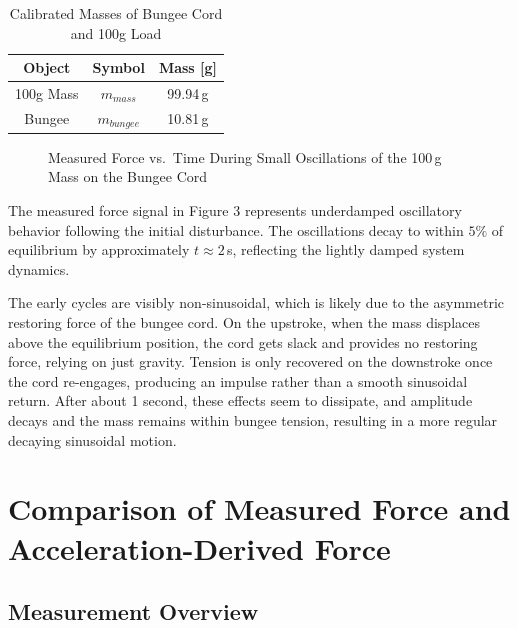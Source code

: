 \documentclass{article}
\begin{document}
\begin{table}[H]
    \centering
    \caption{Calibrated Masses of Bungee Cord and 100g Load}
    \label{tab:placehold}
    \begin{tabular}{ccc}
        \toprule
        \textbf{Object} & \textbf{Symbol} & \textbf{Mass [g]} \\
        \midrule
        100g Mass   & $m_{mass}$   &    99.94\,g \\
        Bungee  &   $m_{bungee}$    & 10.81\,g \\
        \bottomrule
    \end{tabular}
\end{table}

\begin{figure}[H]
    \centering
    \caption{Measured Force vs.\ Time During Small Oscillations of the 100\,g Mass on the Bungee Cord}
    \label{fig:force_meas}
\end{figure}

\noindent The measured force signal in Figure 3 represents underdamped oscillatory behavior following the initial disturbance. The oscillations decay to within $5\%$ of equilibrium by approximately $t \approx 2$\,s, reflecting the lightly damped system dynamics.

The early cycles are visibly non-sinusoidal, which is likely due to the asymmetric restoring force of the bungee cord. On the upstroke, when the mass displaces above the equilibrium position, the cord gets slack and provides no restoring force, relying on just gravity. Tension is only recovered on the downstroke once the cord re-engages, producing an impulse rather than a smooth sinusoidal return. After about 1 second, these effects seem to dissipate, and amplitude decays and the mass remains within bungee tension, resulting in a more regular decaying sinusoidal motion.

\section{Comparison of Measured Force and Acceleration-Derived Force}

\subsection{Measurement Overview}
\end{document}

